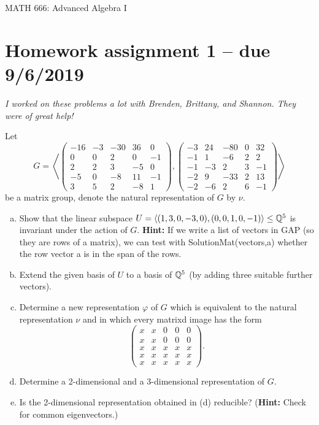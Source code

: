 \documentclass[leqno]{article}
\author{Colin Roberts}
\begin{document}
\begin{center}
  \begin{huge}
    MATH 666: Advanced Algebra I
  \end{huge}
\end{center}

\section*{Homework assignment 1 -- due 9/6/2019}

\emph{I worked on these problems a lot with Brenden, Brittany, and Shannon. They were of great help!}

\begin{problem}
Let
\[
G= \left\langle \begin{pmatrix}
-16 & -3 & -30 & 36 & 0\\
0 & 0 & 2 & 0 & -1\\
2 & 2 & 3 & -5 & 0\\
-5 & 0 & -8 & 11 & -1\\
3 & 5 & 2 & -8 & 1
\end{pmatrix}, \begin{pmatrix}
-3 & 24 & -80 & 0 & 32\\
-1 & 1 & -6  & 2 & 2\\
-1 & -3 & 2 & 3 & -1\\
-2 & 9 & -33 & 2 & 13\\
-2 & -6 & 2 & 6 & -1
\end{pmatrix}\right\rangle 
\]
be a matrix group, denote the natural representation of $G$ by $\nu$.
\begin{enumerate}[(a)]
    \item Show that the linear subspace $U=\langle (1,3,0,-3,0),(0,0,1,0,-1)\rangle \leq \mathbb{Q}^5$ is invariant under the action of $G$. \textbf{Hint:} If we write a list of vectors in \textsf{GAP} (so they are rows of a matrix), we can test with \textsf{SolutionMat(vectors,a)} whether the row vector \textsf{a} is in the span of the rows.
    \item Extend the given basis of $U$ to a basis of $\mathbb{Q}^5$ (by adding three suitable further vectors).
    \item Determine a new representation $\varphi$ of $G$ which is equivalent to the natural representation $\nu$ and in which every matrixd image has the form
    \[
    \begin{pmatrix}
    x & x & 0 & 0 & 0\\
    x & x & 0 & 0 & 0\\
    x & x & x & x & x\\
    x & x & x & x & x\\
    x & x & x & x & x
    \end{pmatrix}.
    \]
    \item Determine a 2-dimensional and a 3-dimensional representation of $G$.
    \item Is the 2-dimensional representation obtained in (d) reducible? (\textbf{Hint:} Check for common eigenvectors.)
    \end{enumerate}
\end{problem}
\end{document}
